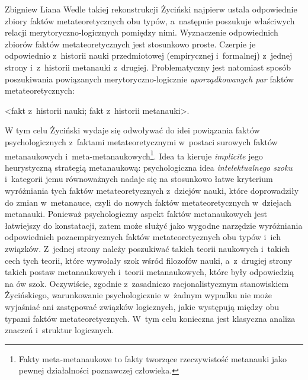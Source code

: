 \begin{artplenv}{Zbigniew Liana}
Wedle takiej rekonstrukcji Życiński najpierw ustala odpowiednie zbiory faktów metateoretycznych obu typów, a~następnie
poszukuje właściwych relacji merytoryczno-logicznych pomiędzy nimi. Wyznaczenie odpowiednich zbiorów faktów
metateoretycznych jest stosunkowo proste. Czerpie je odpowiednio z~historii nauki przedmiotowej
(empirycznej i~formalnej) z~jednej strony i~z~historii metanauki z~drugiej. Problematyczny jest natomiast sposób poszukiwania
powiązanych merytoryczno-logicznie \textit{uporządkowanych par} faktów metateoretycznych: 

\smallskip
{\centering
	{\textless}fakt z~historii nauki; fakt z~historii metanauki{\textgreater}.
\par}
\smallskip


W tym celu Życiński wydaje się odwoływać do idei powiązania faktów psychologicznych z~faktami metateoretycznymi w~postaci
surowych faktów metanaukowych i~meta-metanaukowych\footnote{Fakty meta-metanaukowe to fakty tworzące
rzeczywistość metanauki jako pewnej działalności poznawczej człowieka.}. Idea ta kieruje \textit{implicite} jego
heurystyczną strategią metanaukową: psychologiczna idea \textit{intelektualnego szoku} i~kategorii jemu równoważnych
nadaje się na stosunkowo łatwe kryterium wyróżniania tych faktów metateoretycznych z~dziejów nauki, które doprowadziły
do zmian w~metanauce, czyli do nowych faktów metateoretycznych w~dziejach metanauki. Ponieważ psychologiczny aspekt
faktów metanaukowych jest łatwiejszy do konstatacji, zatem może służyć jako wygodne narzędzie wyróżniania odpowiednich
pozaempirycznych faktów metateoretycznych obu typów i~ich związków. Z~jednej strony należy poszukiwać takich teorii
naukowych i~takich cech tych teorii, które wywołały szok wśród filozofów nauki, a~z~drugiej strony takich postaw
metanaukowych i~teorii metanaukowych, które były odpowiedzią na ów szok. Oczywiście, zgodnie z~zasadniczo
racjonalistycznym stanowiskiem Życińskiego, warunkowanie psychologicznie w~żadnym wypadku nie może wyjaśniać ani
zastępować związków logicznych, jakie występują między obu typami faktów metateoretycznych. W~tym celu konieczna jest
klasyczna analiza znaczeń i~struktur logicznych.


\end{artplenv}
